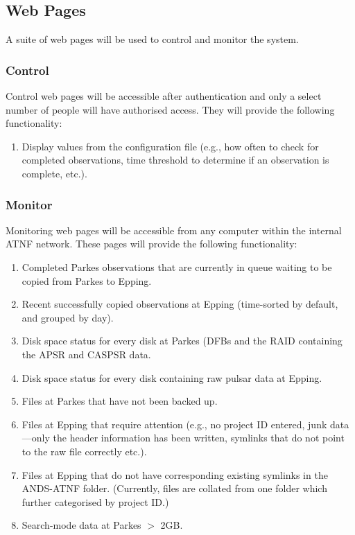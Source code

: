 \documentclass{article}
\begin{document}
\subsection{Web Pages}
A suite of web pages will be used to control and monitor the system.

\subsubsection{Control}
Control web pages will be accessible after authentication and only a select number of people will have authorised access. They will provide the following functionality:

\begin{enumerate}
\item Display values from the configuration file (e.g., how often to check for completed observations, time threshold to determine if an observation is complete, etc.).
\end{enumerate}

\subsubsection{Monitor}
Monitoring web pages will be accessible from any computer within the internal ATNF network. These pages will provide the following functionality:

\begin{enumerate}
\item Completed Parkes observations that are currently in queue waiting to be copied from Parkes to Epping.
\item Recent successfully copied observations at Epping (time-sorted by default, and grouped by day).
\item Disk space status for every disk at Parkes (DFBs and the RAID containing the APSR and CASPSR data.
\item Disk space status for every disk containing raw pulsar data at Epping.
\item Files at Parkes that have not been backed up.
\item Files at Epping that require attention (e.g., no project ID entered, junk data---only the header information has been written, symlinks that do not point to the raw file correctly etc.).
\item Files at Epping that do not have corresponding existing symlinks in the ANDS-ATNF folder. (Currently, files are collated from one folder which further categorised by project ID.)
\item Search-mode data at Parkes $>$ 2GB.
\end{enumerate}
\end{document}
